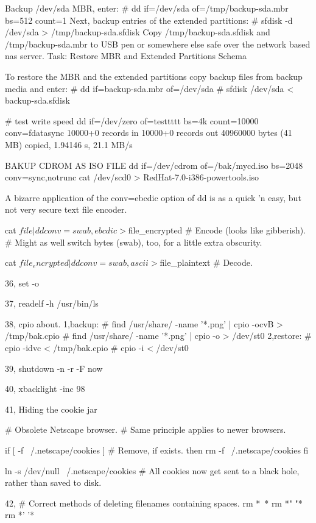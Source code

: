 Backup /dev/sda MBR, enter:
# dd if=/dev/sda of=/tmp/backup-sda.mbr bs=512 count=1
Next, backup entries of the extended partitions:
# sfdisk -d /dev/sda > /tmp/backup-sda.sfdisk
Copy /tmp/backup-sda.sfdisk and /tmp/backup-sda.mbr to USB pen or somewhere else safe over the network based nas server.
Task: Restore MBR and Extended Partitions Schema

To restore the MBR and the extended partitions copy backup files from backup media and enter:
# dd if=backup-sda.mbr of=/dev/sda
# sfdisk /dev/sda < backup-sda.sfdisk

# test write speed
dd if=/dev/zero of=testtttt bs=4k count=10000 conv=fdatasync
 10000+0 records in
 10000+0 records out
 40960000 bytes (41 MB) copied, 1.94146 s, 21.1 MB/s



BAKUP CDROM AS ISO FILE
dd if=/dev/cdrom of=/bak/mycd.iso bs=2048 conv=sync,notrunc
cat /dev/scd0 > RedHat-7.0-i386-powertools.iso 

A bizarre application of the conv=ebcdic option of dd is as a quick 'n easy, but not very secure text file encoder.

    cat $file | dd conv=swab,ebcdic > $file_encrypted
    # Encode (looks like gibberish).		    
    # Might as well switch bytes (swab), too, for a little extra obscurity.
    
    cat $file_encrypted | dd conv=swab,ascii > $file_plaintext
    # Decode.

36, set -o

37, readelf -h /usr/bin/ls 

38, cpio about.
1,backup:
# find /usr/share/ -name '*.png' | cpio -ocvB > /tmp/bak.cpio
# find /usr/share/ -name '*.png' | cpio -o > /dev/st0
2,restore:
# cpio -idvc < /tmp/bak.cpio
# cpio -i < /dev/st0

39, shutdown -n -r -F now

40, xbacklight -inc 98

41, Hiding the cookie jar

    # Obsolete Netscape browser.
    # Same principle applies to newer browsers.
    
    if [ -f ~/.netscape/cookies ]  # Remove, if exists.
    then
      rm -f ~/.netscape/cookies
    fi
    
    ln -s /dev/null ~/.netscape/cookies
    # All cookies now get sent to a black hole, rather than saved to disk.

42, # Correct methods of deleting filenames containing spaces.
    rm *\ *
    rm *" "*
    rm *' '*


